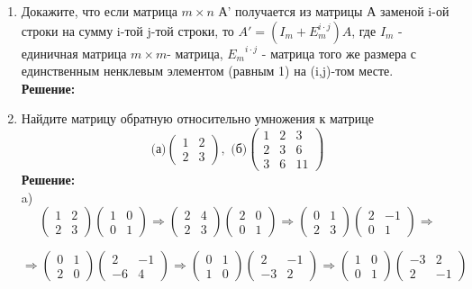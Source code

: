\documentclass[]{book}
\theoremstyle{definition}
\begin{document}
\begin{enumerate}[resume]
\item Докажите, что если матрица $m\times n$ А' получается из матрицы А заменой i-ой строки на сумму i-той j-той строки, то $A'=(I_m +E_m^{i\cdot j})A$, где $I_m$ - единичная матрица $m\times m$- матрица, ${E_m}^{i\cdot j}$ - матрица того же размера с единственным ненклевым элементом (равным 1) на (i,j)-том месте.\\
\textbf{Решение:}\\



\item Найдите матрицу обратную относительно умножения к матрице
$$\text{(а)} \begin{pmatrix} 
1 & 2 \\
2 & 3
\end{pmatrix},
\text{  (б)} \begin{pmatrix} 
1 & 2 & 3\\
2 & 3 & 6 \\
3 & 6 & 11
\end{pmatrix}
$$
\textbf{Решение:}\\
a)
$$\begin{pmatrix} 
1 & 2 \\
2 & 3
\end{pmatrix} \begin{pmatrix} 
1 & 0 \\
0 & 1
\end{pmatrix} \Rightarrow \begin{pmatrix} 
2 & 4 \\
2 & 3
\end{pmatrix} \begin{pmatrix} 
2 & 0 \\
0 & 1
\end{pmatrix} \Rightarrow \begin{pmatrix} 
0 & 1 \\
2 & 3
\end{pmatrix}\begin{pmatrix} 
2 & -1 \\
0 & 1
\end{pmatrix} \Rightarrow 
$$

$$\Rightarrow \begin{pmatrix} 
0 & 1 \\
2 & 0
\end{pmatrix}\begin{pmatrix} 
2 & -1 \\
-6 & 4
\end{pmatrix} \Rightarrow\begin{pmatrix} 
0 & 1 \\
1 & 0
\end{pmatrix}\begin{pmatrix} 
2 & -1 \\
-3 & 2
\end{pmatrix}
\Rightarrow \begin{pmatrix} 
1 & 0 \\
0 & 1
\end{pmatrix}\begin{pmatrix} 
-3 & 2 \\
2 & -1
\end{pmatrix}$$\\


\end{enumerate}
\end{document}
